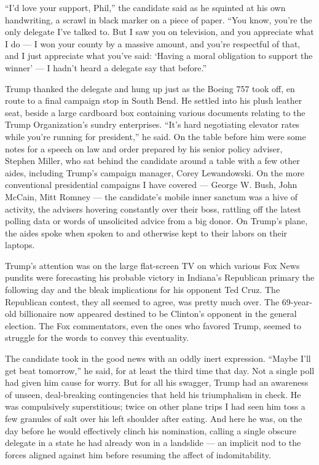 ``I'd love your support, Phil,'' the candidate said as he squinted at
his own handwriting, a scrawl in black marker on a piece of paper. ``You
know, you're the only delegate I've talked to. But I saw you on
television, and you appreciate what I do --- I won your county by a
massive amount, and you're respectful of that, and I just appreciate
what you've said: `Having a moral obligation to support the winner' ---
I hadn't heard a delegate say that before.''

Trump thanked the delegate and hung up just as the Boeing 757 took off,
en route to a final campaign stop in South Bend. He settled into his
plush leather seat, beside a large cardboard box containing various
documents relating to the Trump Organization's sundry enterprises.
``It's hard negotiating elevator rates while you're running for
president,'' he said. On the table before him were some notes for a
speech on law and order prepared by his senior policy adviser, Stephen
Miller, who sat behind the candidate around a table with a few other
aides, including Trump's campaign manager, Corey Lewandowski. On the
more conventional presidential campaigns I have covered --- George W.
Bush, John McCain, Mitt Romney --- the candidate's mobile inner sanctum
was a hive of activity, the advisers hovering constantly over their
boss, rattling off the latest polling data or words of unsolicited
advice from a big donor. On Trump's plane, the aides spoke when spoken
to and otherwise kept to their labors on their laptops.

Trump's attention was on the large flat-screen TV on which various Fox
News pundits were forecasting his probable victory in Indiana's
Republican primary the following day and the bleak implications for his
opponent Ted Cruz. The Republican contest, they all seemed to agree, was
pretty much over. The 69-year-old billionaire now appeared destined to
be Clinton's opponent in the general election. The Fox commentators,
even the ones who favored Trump, seemed to struggle for the words to
convey this eventuality.

The candidate took in the good news with an oddly inert expression.
``Maybe I'll get beat tomorrow,'' he said, for at least the third time
that day. Not a single poll had given him cause for worry. But for all
his swagger, Trump had an awareness of unseen, deal-breaking
contingencies that held his triumphalism in check. He was compulsively
superstitious; twice on other plane trips I had seen him toss a few
granules of salt over his left shoulder after eating. And here he was,
on the day before he would effectively clinch his nomination, calling a
single obscure delegate in a state he had already won in a landslide ---
an implicit nod to the forces aligned against him before resuming the
affect of indomitability.

